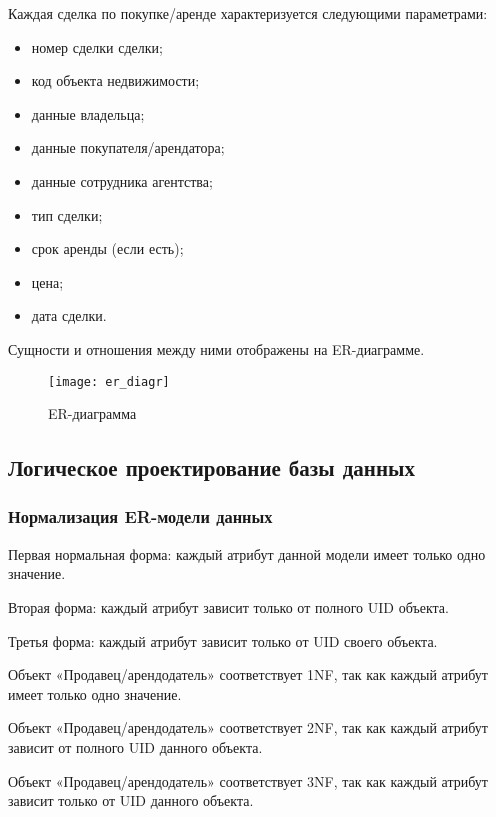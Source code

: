 Каждая сделка по покупке/аренде характеризуется следующими параметрами:
\begin{itemize}
\item	номер сделки сделки;

\item	код объекта недвижимости;

\item	данные владельца;

\item	данные покупателя/арендатора;

\item	данные сотрудника агентства;

\item	тип сделки;

\item	срок аренды (если есть);

\item	цена;

\item	дата сделки.
\end{itemize}
Сущности и отношения между ними отображены на ER-диаграмме.
\begin{figure}[H]
\texttt{[image: er\_diagr]}
\caption{ER-диаграмма}
\label{ER_diagramma:image}
\end{figure}

\subsection{Логическое проектирование базы данных}

\subsubsection{Нормализация ER-модели данных}

Первая нормальная форма: каждый атрибут данной модели имеет только
одно значение.

Вторая форма: каждый атрибут зависит только от полного UID объекта.

Третья форма: каждый атрибут зависит только от UID своего объекта.

Объект «Продавец/арендодатель» соответствует 1NF, так как каждый атрибут имеет только одно значение.

Объект «Продавец/арендодатель» соответствует 2NF, так как каждый атрибут зависит от полного UID данного объекта.

Объект «Продавец/арендодатель» соответствует 3NF, так как каждый атрибут зависит только от UID данного объекта.

